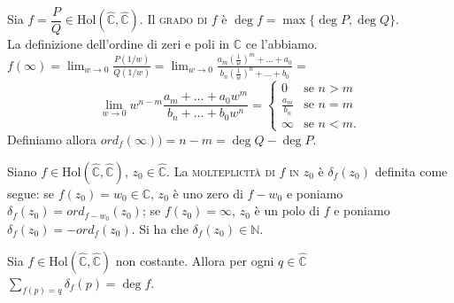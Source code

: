 \begin{defn}
  Sia $f=\dfrac{P}{Q} \in \text{Hol}(\hat{\mathbb{C}}, \hat{\mathbb{C}})$. Il \textsc{grado di $f$} è $\deg{f}=\max{\{\deg{P}, \deg{Q}\}}$. \\
  La definizione dell'ordine di zeri e poli in $\mathbb{C}$ ce l'abbiamo. \\
  $\displaystyle f(\infty)=\lim_{w \longrightarrow 0} \frac{P(1/w)}{Q(1/w)}=\lim_{w \longrightarrow 0} \frac{a_m\left(\frac{1}{w}\right)^m+\dots+a_0}{b_n\left(\frac{1}{w}\right)^n+\dots+b_0}=$ \\
  $$\lim_{w \longrightarrow 0} w^{n-m} \frac{a_m+\dots+a_0w^m}{b_n+\dots+b_0w^n}=\begin{cases} 0 & \mbox{se }n>m \\ \frac{a_m}{b_n} & \mbox{se }n=m \\ \infty & \mbox{se } n<m. \end{cases}$$
  Definiamo allora $ord_f(\infty))=n-m=\deg{Q}-\deg{P}$.
\end{defn}

\begin{defn}
  Siano $f \in \text{Hol}(\hat{\mathbb{C}}, \hat{\mathbb{C}})$, $z_0 \in \hat{\mathbb{C}}$.
  La \textsc{molteplicità di $f$ in $z_0$} è $\delta_f(z_0)$ definita come segue: se $f(z_0)=w_0 \in \mathbb{C}$, $z_0$ è uno zero di $f-w_0$ e poniamo $\delta_f(z_0)=ord_{f-w_0}(z_0)$; se $f(z_0)=\infty$, $z_0$ è un polo di $f$ e poniamo $\delta_f(z_0)=-ord_f(z_0)$. Si ha che $\delta_f(z_0) \in \mathbb{N}$.
\end{defn}

\begin{prop}
  Sia $f \in \text{Hol}(\hat{\mathbb{C}}, \hat{\mathbb{C}})$ non costante. Allora per ogni $q \in \hat{\mathbb{C}}$ $\displaystyle \sum_{f(p)=q} \delta_f(p)=\deg{f}$.
\end{prop}

